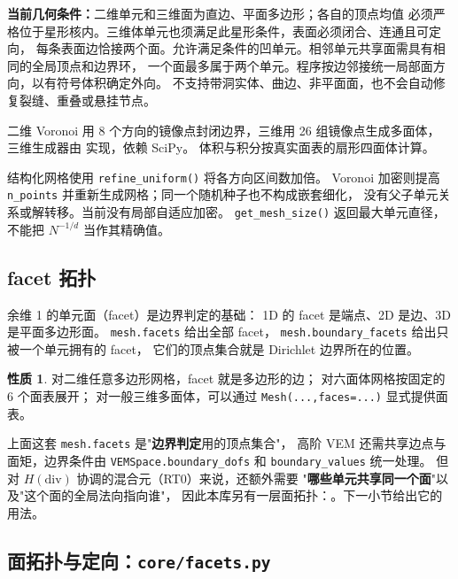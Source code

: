 \documentclass[UTF8,11pt,oneside]{ctexbook}
\theoremstyle{definition}
\newtheorem{property}{性质}[chapter]
\theoremstyle{plain}
\newenvironment{caution}{%
  \begin{tcolorbox}[colback=orange!5,colframe=orange!55,title=注意,fonttitle=\bfseries]%
}{%
  \end{tcolorbox}%
}
\newcommand{\code}[1]{\texttt{#1}}
\begin{document}
\textbf{当前几何条件：}二维单元和三维面为直边、平面多边形；各自的顶点均值
必须严格位于星形核内。三维体单元也须满足此星形条件，表面必须闭合、连通且可定向，
每条表面边恰接两个面。允许满足条件的凹单元。相邻单元共享面需具有相同的全局顶点和边界环，
一个面最多属于两个单元。程序按边邻接统一局部面方向，以有符号体积确定外向。
不支持带洞实体、曲边、非平面面，也不会自动修复裂缝、重叠或悬挂节点。

二维 Voronoi 用 8 个方向的镜像点封闭边界，三维用 26 组镜像点生成多面体，
三维生成器由  实现，依赖 SciPy。
体积与积分按真实面表的扇形四面体计算。

结构化网格使用 \code{refine\_\allowbreak uniform()} 将各方向区间数加倍。
Voronoi 加密则提高 \code{n\_\allowbreak points} 并重新生成网格；同一个随机种子也不构成嵌套细化，
没有父子单元关系或解转移。当前没有局部自适应加密。
\code{get\_\allowbreak mesh\_\allowbreak size()} 返回最大单元直径，不能把 $N^{-1/d}$ 当作其精确值。

\subsection{facet 拓扑}

余维 1 的单元面（facet）是边界判定的基础：
1D 的 facet 是端点、2D 是边、3D 是平面多边形面。
\code{mesh.facets} 给出全部 facet，
\code{mesh.boundary\_\allowbreak facets} 给出只被一个单元拥有的 facet，
它们的顶点集合就是 Dirichlet 边界所在的位置。

\begin{property}
对二维任意多边形网格，facet 就是多边形的边；
对六面体网格按固定的 6 个面表展开；
对一般三维多面体，可以通过 \code{Mesh(...,\allowbreak  faces=...)} 显式提供面表。
\end{property}

\begin{caution}
上面这套 \code{mesh.facets} 是"\textbf{边界判定}用的顶点集合"，
高阶 VEM 还需共享边点与面矩，边界条件由 \code{VEMSpace.boundary\_\allowbreak dofs} 和 \code{boundary\_\allowbreak values} 统一处理。
但对 $H(\mathrm{div})$ 协调的混合元（RT0）来说，还额外需要
"\textbf{哪些单元共享同一个面}"以及"这个面的全局法向指向谁"，
因此本库另有一层面拓扑：。下一小节给出它的用法。
\end{caution}

\subsection{面拓扑与定向：\code{core/facets.py}}
\label{sec:facets}
\end{document}
